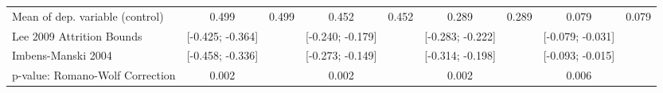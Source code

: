 {\begin{tabular}{l*{8}{c}}
Mean of dep. variable (control)                   &       0.499         &       0.499         &       0.452         &       0.452         &       0.289         &       0.289         &       0.079         &       0.079         \\
Lee 2009 Attrition Bounds                         &[-0.425; -0.364]         &                     &[-0.240; -0.179]         &                     &[-0.283; -0.222]         &                     &[-0.079; -0.031]         &                     \\
Imbens-Manski 2004                                &[-0.458; -0.336]         &                     &[-0.273; -0.149]         &                     &[-0.314; -0.198]         &                     &[-0.093; -0.015]         &                     \\
p-value: Romano-Wolf Correction                   &       0.002         &                     &       0.002         &                     &       0.002         &                     &       0.006         &                     \\
\hline\hline
\end{tabular}
}
